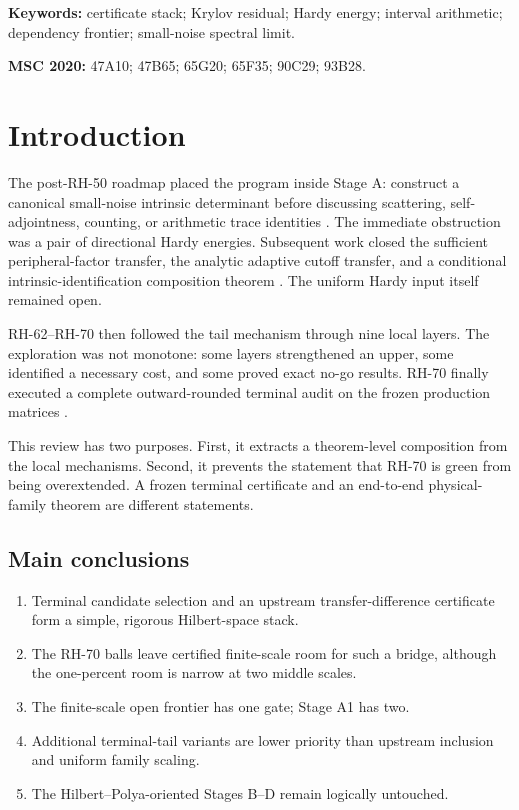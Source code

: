 \documentclass[11pt]{article}
\theoremstyle{definition}
\begin{document}
\noindent\textbf{Keywords:} certificate stack; Krylov residual; Hardy energy;
interval arithmetic; dependency frontier; small-noise spectral limit.

\medskip
\noindent\textbf{MSC 2020:} 47A10; 47B65; 65G20; 65F35; 90C29; 93B28.

\section{Introduction}

The post-RH-50 roadmap placed the program inside Stage A: construct a
canonical small-noise intrinsic determinant before discussing scattering,
self-adjointness, counting, or arithmetic trace identities
\citep{WangRoadmap2026}.  The immediate obstruction was a pair of
directional Hardy energies.  Subsequent work closed the sufficient
peripheral-factor transfer, the analytic adaptive cutoff transfer, and a
conditional intrinsic-identification composition theorem
\citep{WangFactorTransfer2026,WangIdentification2026,WangStrongWeak2026}.
The uniform Hardy input itself remained open.

RH-62--RH-70 then followed the tail mechanism through nine local layers.
The exploration was not monotone: some layers strengthened an upper, some
identified a necessary cost, and some proved exact no-go results.  RH-70
finally executed a complete outward-rounded terminal audit on the frozen
production matrices \citep{WangFrozen2026}.

This review has two purposes.  First, it extracts a theorem-level composition
from the local mechanisms.  Second, it prevents the statement that RH-70 is
green from being overextended.  A frozen terminal certificate and an
end-to-end physical-family theorem are different statements.

\subsection*{Main conclusions}

\begin{enumerate}[leftmargin=2.2em]
 \item Terminal candidate selection and an upstream transfer-difference
       certificate form a simple, rigorous Hilbert-space stack.
 \item The RH-70 balls leave certified finite-scale room for such a bridge,
       although the one-percent room is narrow at two middle scales.
 \item The finite-scale open frontier has one gate; Stage A1 has two.
 \item Additional terminal-tail variants are lower priority than upstream
       inclusion and uniform family scaling.
 \item The Hilbert--Polya-oriented Stages B--D remain logically untouched.
\end{enumerate}
\end{document}
